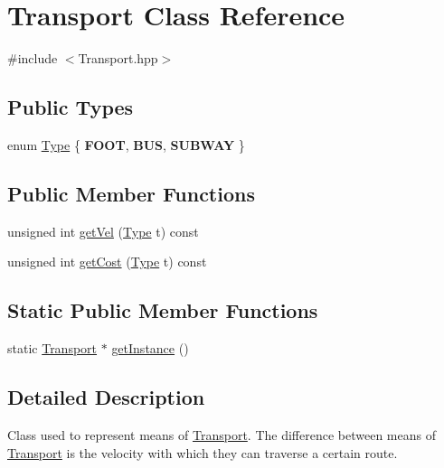 \hypertarget{class_transport}{}\section{Transport Class Reference}
\label{class_transport}


{\ttfamily \#include $<$Transport.\+hpp$>$}

\subsection*{Public Types}
\begin{DoxyCompactItemize}
\item 
enum \hyperlink{class_transport_a1879cecfed0d4238e5a7af6d085db317}{Type} \{ {\bfseries F\+O\+OT}, 
{\bfseries B\+US}, 
{\bfseries S\+U\+B\+W\+AY}
 \}
\end{DoxyCompactItemize}
\subsection*{Public Member Functions}
\begin{DoxyCompactItemize}
\item 
unsigned int \hyperlink{class_transport_ae9b8f3d27331e429160827194e32bde1}{get\+Vel} (\hyperlink{class_transport_a1879cecfed0d4238e5a7af6d085db317}{Type} t) const
\item 
unsigned int \hyperlink{class_transport_a943eecabe9f2435fcbf2bd3a41a4ea3a}{get\+Cost} (\hyperlink{class_transport_a1879cecfed0d4238e5a7af6d085db317}{Type} t) const
\end{DoxyCompactItemize}
\subsection*{Static Public Member Functions}
\begin{DoxyCompactItemize}
\item 
static \hyperlink{class_transport}{Transport} $\ast$ \hyperlink{class_transport_a2265878b8225332acf586bece5f1b324}{get\+Instance} ()
\end{DoxyCompactItemize}


\subsection{Detailed Description}
Class used to represent means of \hyperlink{class_transport}{Transport}. The difference between means of \hyperlink{class_transport}{Transport} is the velocity with which they can traverse a certain route. 


